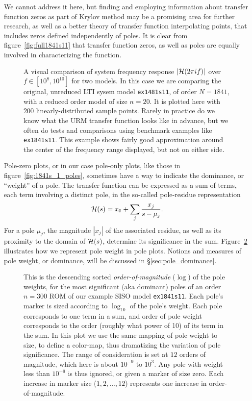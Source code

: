 \smallskip
We cannot address it here, but finding and employing information about transfer function zeros as part of Krylov method may be a promising area for further research, as well as a better theory of transfer function interpolating points, that includes zeros defined independently of poles.   It is clear from figure~\ref{fig:full1841s11} that transfer function zeros, as well as poles are equally involved in characterizing the function.    
\begin{figure}[htb]
\centering
{}
\caption{\label{fig:1841s_1ROMexamp} A visual comparison of system frequency response $|\mathcal{H}(2\pi i f) |$ over $f\in[10^{8},10^{10}]$ for two models. In this case we are comparing the original, unreduced LTI sysem model \texttt{ex1481s11}, of order $N=1841$, with a reduced order model of size $n=20$.  It is plotted here with $200$ linearly-distributed sample points.  Rarely in practice do we know what the URM transfer function looks like in advance,  but we often do tests and comparisons using benchmark examples like \texttt{ex1841s11}. This example shows fairly good approximation around the center of the frequency range displayed, but not on either side.}
\end{figure}

\smallskip
Pole-zero plots, or in our case pole-only plots, like those in figure~\ref{fig:1841s_1_poles}, sometimes have a way to indicate the dominance, or ``weight'' of a pole.  The transfer  function can be expressed as a sum of terms, each term involving a distinct pole, in the so-called pole-residue representation
\[
\mathcal{H}(s) = x_0 + \sum_j \frac{x_j}{s-\mu_j}. 
\]
For a pole $\mu_j$, the magnitude $|x_j|$ of the associated residue, as well as its proximity to the domain of $\mathcal{H}(s)$, determine its significance in the sum. Figure~\ref{fig:1841s_1polewt} illustrates how we represent pole weight in pole plots.  Notions and measures of pole weight, or dominance, will be discussed in \S\ref{sec:pole_dominance}.   


\begin{figure}[htbp]
\centering
{}
\caption{\label{fig:1841s_1polewt} This is the descending sorted \emph{order-of-magnitude} ($\log$) of the pole weights, for the most significant (aka dominant) poles of an order $n=300$ ROM of our example SISO model \texttt{ex1841s11}.  Each pole's marker is sized according to $\log_{10}$ of the pole's weight.  Each pole corresponds to one term in a sum, and order of pole weight corresponds to the order (roughly what power of 10) of its term in the sum.  In this plot we use the same mapping of pole weight to size, to define a color-map, thus dramatizing the variation of pole significance.  The range of consideration is set at $12$ orders of magnitude, which here is about $10^{-9}$ to $10^3$. Any pole with weight less than $10^{-9}$ is thus ignored, or given a marker of size zero. Each increase in marker size ($1,2,...,12$) represents one increase in order-of-magnitude.}
\end{figure}

